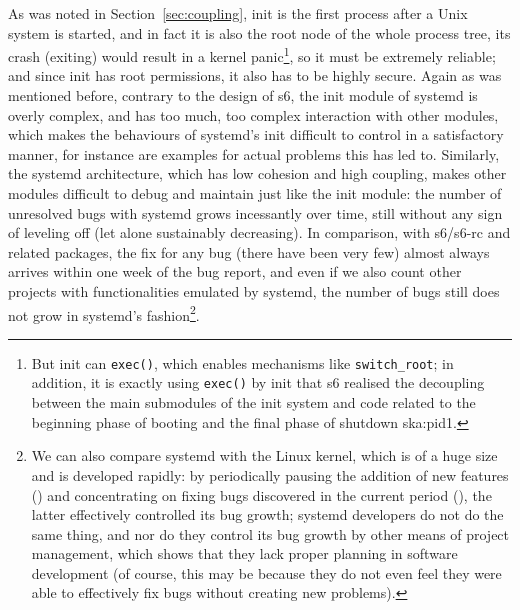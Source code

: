 As was noted in Section~\ref{sec:coupling}, init is the first process after a
Unix system is started, and in fact it is also the root node of the whole
process tree, its crash (exiting) would result in a kernel panic\footnote{But
init can \texttt{exec()}, which enables mechanisms like \texttt{switch\_root};
in addition, it is exactly using \texttt{exec()} by init that s6 realised the
decoupling between the main submodules of the init system and code related to
the beginning phase of booting and the final phase of shutdown\cupercite%
{ska:pid1}.}, so it must be extremely reliable; and since init has root
permissions, it also has to be highly secure.  Again as was mentioned before,
contrary to the design of s6, the init module of systemd is overly complex,
and has too much, too complex interaction with other modules, which makes
the behaviours of systemd's init difficult to control in a satisfactory
manner, for instance \parencite{ayer2016, edge2017} are examples for actual
problems this has led to.  Similarly, the systemd architecture, which has
low cohesion and high coupling, makes other modules difficult to debug and
maintain just like the init module: the number of unresolved bugs with systemd
grows incessantly over time, still without any sign of leveling off (let alone
sustainably decreasing).  In comparison, with s6/s6-rc
and related packages, the fix for any bug (there have been very few) almost
always arrives within one week of the bug report, and even if we also count
other projects with functionalities emulated by systemd, the number of bugs
still does not grow in systemd's fashion\footnote{We can also compare systemd
with the Linux kernel, which is of a huge size and is developed rapidly: by
periodically pausing the addition of new features ()
and concentrating on fixing bugs discovered in the current period (), the latter effectively controlled its bug growth; systemd developers
do not do the same thing, and nor do they control its bug growth by other means
of project management, which shows that they lack proper planning in software
development (of course, this may be because they do not even feel they were
able to effectively fix bugs without creating new problems).}.

